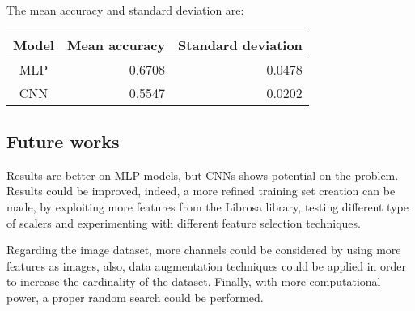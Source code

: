 The mean accuracy and standard deviation are: 
\begin{center}
    \begin{tabular}{ |c|r|r| } 
        \hline
        Model & Mean accuracy & Standard deviation\\
        \hline
        MLP & 0.6708 & 0.0478 \\
        CNN & 0.5547 & 0.0202 \\
        \hline
    \end{tabular}
\end{center}

\subsection{Future works}

Results are better on MLP models, but CNNs
shows potential on the problem.
Results could be improved, indeed, 
a more refined training set creation can be made, by exploiting 
more features from the Librosa library, testing different type 
of scalers and experimenting with different feature selection 
techniques.

Regarding the image dataset, more channels could be considered 
by using more features as images, also, data augmentation techniques 
could be applied in order to increase the cardinality of the dataset.
Finally, with more computational power, a proper random search could be performed.